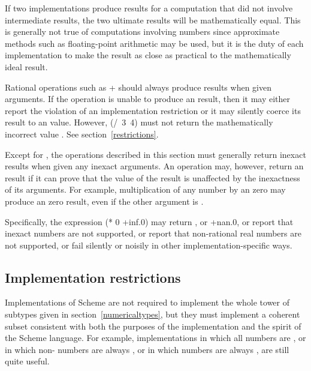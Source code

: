 \vest If two implementations produce  results for a
computation that did not involve  intermediate results,
the two ultimate results will be mathematically equal.  This is
generally not true of computations involving  numbers
since approximate methods such as floating-point arithmetic may be used,
but it is the duty of each implementation to make the result as close as
practical to the mathematically ideal result.

\vest Rational operations such as {\cf +} should always produce
 results when given  arguments.
If the operation is unable to produce an  result,
then it may either report the violation of an implementation restriction
or it may silently coerce its
result to an  value.
However, {\cf (/~3~4)} must not return the mathematically incorrect value {}.
See section~\ref{restrictions}.

\vest Except for , the operations described in
this section must generally return inexact results when given any inexact
arguments.  An operation may, however, return an  result if it can
prove that the value of the result is unaffected by the inexactness of its
arguments.  For example, multiplication of any number by an  zero
may produce an  zero result, even if the other argument is
.

Specifically, the expression {\cf (* 0 +inf.0)} may return {},
or {\cf +nan.0}, or report that inexact numbers are not supported,
or report that non-rational real numbers are not supported, or fail
silently or noisily in other implementation-specific ways.

\subsection{Implementation restrictions}

\label{restrictions}

\vest Implementations of Scheme are not required to implement the whole
tower of subtypes given in section~\ref{numericaltypes},
but they must implement a coherent subset consistent with both the
purposes of the implementation and the spirit of the Scheme language.
For example, implementations in which all numbers are ,
or in which non- numbers are always ,
or in which  numbers are always ,
are still quite useful.

